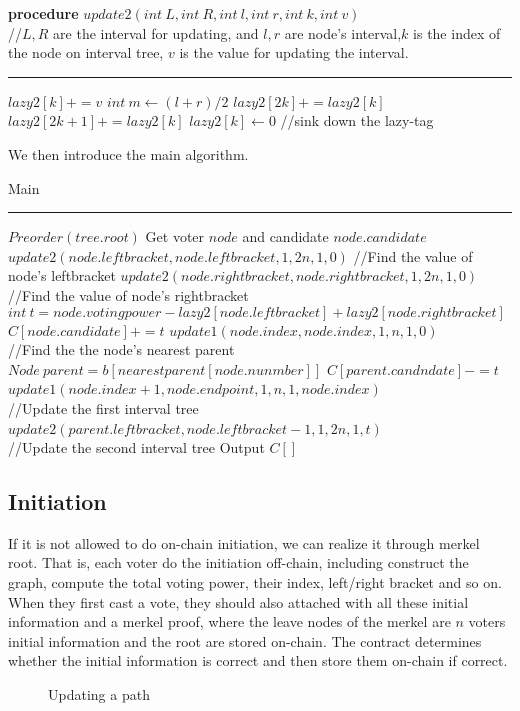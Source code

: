 \begin{algorithm}
	\textbf{procedure} $update2(int~L,int ~R, int~l, int~r, int~k, int~v)${\color{gray}
		\\//$L,R$ are the interval for updating, and $l,r$ are node's interval,$k$ is the index of the node on interval tree, $v$ is the value for updating the interval.}
	\hrule
	{
       $lazy2[k]+=v$
	}
	{
		$int~m \leftarrow (l+r)/2$\;
		$lazy2[2k] += lazy2[k]$\;
		$lazy2[2k+1]+= lazy2[k]$\;
		$lazy2[k] \leftarrow 0$
			{\color{gray}
		//sink down the lazy-tag}\;
    }
\end{algorithm}
We then introduce the main algorithm.
\begin{algorithm}
	\caption{Main}%
	\hrule
	$Preorder(tree.root)$\;
	{
		Get voter $node$ and candidate $node.candidate$\;
		$update2(node.leftbracket,node.leftbracket,1,2n,1,0)${\color{gray}
			//Find the value of node's leftbracket}\;
		$update2(node.rightbracket,node.rightbracket,1,2n,1,0)${\color{gray}
			//Find the value of node's rightbracket}\;
		$int~t=node.votingpower-lazy2[node.leftbracket]+lazy2[node.rightbracket]$\;
		$C[node.candidate]+=t$
		$update1(node.index,node.index,1,n,1,0)${\color{gray}
			\\//Find the the node's nearest parent}\;
		$Node~parent = b[nearestparent[node.nunmber]]$\;
		$C[parent.candndate]-=t$\;
		$update1(node.index+1,node.endpoint,1,n,1,node.index)${\color{gray}
			\\//Update the first interval tree}\;
		$update2(parent.leftbracket,node.leftbracket-1,1,2n,1,t)${\color{gray}
			\\//Update the second interval tree}\;
		Output $C[]$
	}
\end{algorithm}

\subsection{Initiation}
If it is not allowed to do on-chain initiation, we can realize it through merkel root. That is, each voter do the initiation off-chain, including construct the graph, compute the total voting power, their index, left/right bracket and so on. When they first cast a vote, they should also attached with all these initial  information and a merkel proof, where the leave nodes of the merkel are $n$ voters initial information and the root are stored on-chain. The contract determines whether the initial information is correct and then store them on-chain if correct.


\begin{figure}
  \centering
  \label{fig:2}
  
  \caption{Updating a path}
\end{figure}

